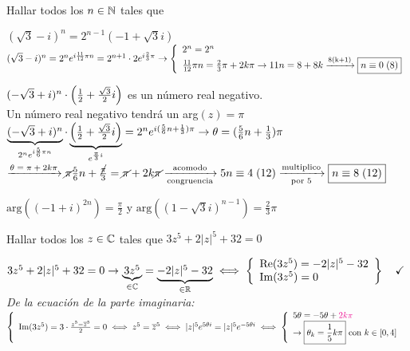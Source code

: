 \documentclass[12pt,a4paper, spanish]{article}
\begin{document}
\ejercicio
Hallar todos los $n \en \naturales$ tales que
\begin{enumerate}[label=\roman*)]
	\begin{minipage}{0.7\textwidth}
		\item $(\sqrt3 -i)^n = 2^{n-1}(-1 + \sqrt3 i)$ \\
		\separadorCorto
		$(\sqrt3 -i)^n = 2^n e^{i\frac{11}{12}\pi n} = 2^{n+1}\cdot 2e^{i \frac{2}{3} \pi}\\
			\to
			\llave{l}{
				2^n = 2^n\\
				\frac{11}{12}\pi n = \frac{2}{3}\pi + 2k \pi \to 11n = 8+8k \flecha{8(k+1)} \boxed{\congruencia{n}{0}{8}}
			}$
	\end{minipage}


	\item $(-\sqrt3 + i)^n \cdot \parentesis{\frac{1}{2} + \frac{\sqrt3}{2}i}$ es un número real negativo.\\
	      \separadorCorto
	      Un número real negativo tendrá un arg$(z) = \pi$\\
	      $\ub{(-\sqrt3 + i)^n}{2^ne^{i\frac{5}{6}\pi n}} \cdot \ub{\parentesis{\frac{1}{2} + \frac{\sqrt3}{2}i}}{e^{\frac{\pi}{3}i}} =
		      2^ne^{i(\frac{5}{6}n + \frac{1}{3}) \pi} \to \theta = (\frac{5}{6}n + \frac{1}{3}) \pi $\\
	      $\flecha{$\theta = \pi + 2k\pi$}
		      \cancel\pi \frac{5}{6}n + \frac{\cancel\pi}{3} = \cancel\pi + 2k\cancel\pi
		      \flecha{acomodo}[congruencia]
		      \congruencia{5n}{4}{12}
		      \flecha{multiplico}[por 5]
		      \boxed{\congruencia{n}{8}{12}} $

	\item $\text{arg}((-1+i)^{2n}) = \frac{\pi}{2}$ y $\text{arg}((1-\sqrt3 i)^{n-1}) = \frac{2}{3}\pi$

	      \separadorCorto
\end{enumerate}

\setcounter{ejercicio}{8}

\ejercicio
Hallar todos los $z \en \complejos$ tales que $3z^5 + 2|z|^5 + 32 = 0$

\separadorCorto
$3 z^5 + 2|z|^5 +32 = 0
	\to
	\ub{3z^5}{\en \complejos} = \ub{-2|z|^5- 32}{\en \reales}
	\sisolosi
	\llaves{l}{
		\re(3z^5) =  -2|z|^5 - 32\\
		\im(3z^5) =  0
	} \Tilde$\\

\textit{De la ecuación de la parte imaginaria: }\\
$\llave{l}{
		\im(3z^5) = 3 \cdot \frac{z^5 - \conj z^5}{2} = 0
		\sisolosi
		z^5 = \conj z^5
		\sisolosi
		|z|^5 e^{5 \theta i} = |z|^5 e^{-5 \theta i}
		\sisolosi
		\llave{l}{
			5 \theta = -5 \theta + \magenta{$2k\pi$}\\
			\to \boxed{\theta_k = \frac{1}{5}k\pi} \text{ con } k \en [0,4]
		}
	}$\\
\end{document}
